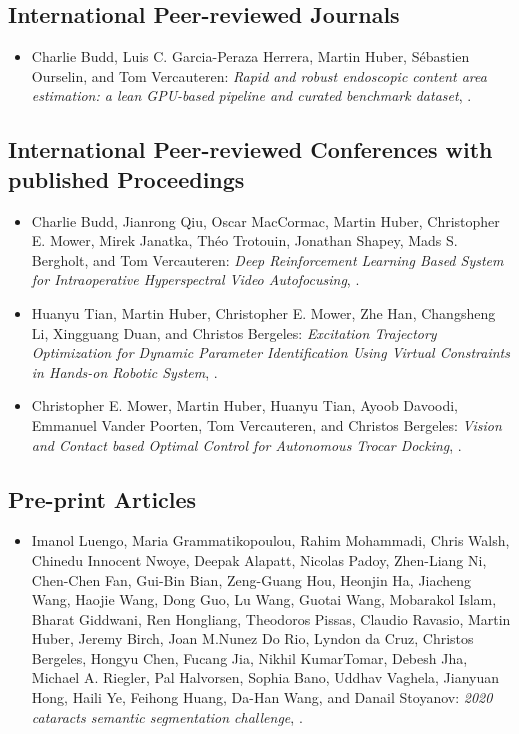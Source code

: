 \subsection{International Peer-reviewed Journals}
\begin{itemize}
    \item Charlie Budd, Luis C. Garcia-Peraza Herrera, Martin Huber, S\'{e}bastien Ourselin, and Tom Vercauteren: \textit{Rapid and robust endoscopic content area estimation: a lean GPU-based pipeline and curated benchmark dataset}, \cite{budd2022rapid}.   
\end{itemize}

\subsection{International Peer-reviewed Conferences with published Proceedings}
\begin{itemize}
    \item Charlie Budd, Jianrong Qiu, Oscar MacCormac, Martin Huber, Christopher E. Mower, Mirek Janatka, Th{\'e}o Trotouin, Jonathan Shapey, Mads S. Bergholt, and Tom Vercauteren: \textit{Deep Reinforcement Learning Based System for Intraoperative Hyperspectral Video Autofocusing}, \cite{budd2023deep}.
    \item Huanyu Tian, Martin Huber, Christopher E. Mower, Zhe Han, Changsheng Li, Xingguang Duan, and Christos Bergeles: \textit{Excitation Trajectory Optimization for Dynamic Parameter Identification Using Virtual Constraints in Hands-on Robotic System}, \cite{tian2024excitation}.
    \item Christopher E. Mower, Martin Huber, Huanyu Tian, Ayoob Davoodi, Emmanuel Vander Poorten, Tom Vercauteren, and Christos Bergeles: \textit{Vision and Contact based Optimal Control for Autonomous Trocar Docking}, \cite{mowervision}.
\end{itemize}

\subsection{Pre-print Articles}
\begin{itemize}
    \item Imanol Luengo, Maria Grammatikopoulou, Rahim Mohammadi, Chris Walsh, Chinedu Innocent Nwoye, Deepak Alapatt, Nicolas Padoy, Zhen-Liang Ni, Chen-Chen Fan, Gui-Bin Bian, Zeng-Guang Hou, Heonjin Ha, Jiacheng Wang, Haojie Wang, Dong Guo, Lu Wang, Guotai Wang, Mobarakol Islam, Bharat Giddwani, Ren Hongliang, Theodoros Pissas, Claudio Ravasio, Martin Huber, Jeremy Birch, Joan M.Nunez Do Rio, Lyndon da Cruz, Christos Bergeles, Hongyu Chen, Fucang Jia, Nikhil KumarTomar, Debesh Jha, Michael A. Riegler, Pal Halvorsen, Sophia Bano, Uddhav Vaghela, Jianyuan Hong, Haili Ye, Feihong Huang, Da-Han Wang, and Danail Stoyanov: \textit{2020 cataracts semantic segmentation challenge}, \cite{luengo20212020}.
\end{itemize}
